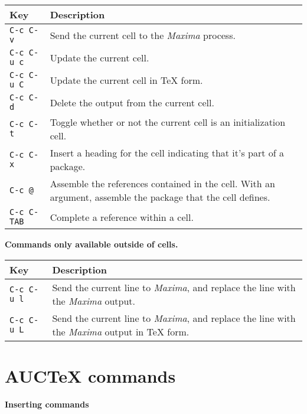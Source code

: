 \documentclass{article}
\newcommand{\mx}{\textsl{\sffamily Maxima}}
\begin{document}
\noindent
\begin{tabular}{p{\firstcol}p{\secondcol}}
\hline
\textbf{Key} & \textbf{Description}\\
\hline
\texttt{C-c C-v}
& Send the current cell to the \mx{} process.\\
\texttt{C-c C-u c}
& Update the current cell.\\
\texttt{C-c C-u C}
& Update the current cell in \TeX{} form.\\
\texttt{C-c C-d}
& Delete the output from the current cell.\\
\texttt{C-c C-t}
& Toggle whether or not the current cell is an initialization cell.\\
\texttt{C-c C-x}
& Insert a heading for the cell indicating that it's part of a
package. \\
\texttt{C-c @}
& Assemble the references contained in the cell.  With an argument,
assemble the package that the cell defines.\\
\texttt{C-c C-\texttt{TAB}}
& Complete a reference within a cell.
\end{tabular}

\smallskip

\noindent
\textbf{Commands only available outside of cells.}

\smallskip

\noindent
\begin{tabular}{p{\firstcol}p{\secondcol}}
\hline
\textbf{Key} & \textbf{Description}\\
\hline
\texttt{C-c C-u l}
& Send the current line to \mx{}, and replace the line with the
\mx{} output.\\
\texttt{C-c C-u L}
& Send the current line to \mx{}, and replace the line with the
\mx{} output in \TeX{} form.
\end{tabular}


\section{AUC\TeX{} commands}

\smallskip

\noindent
\textbf{Inserting commands}
\end{document}
